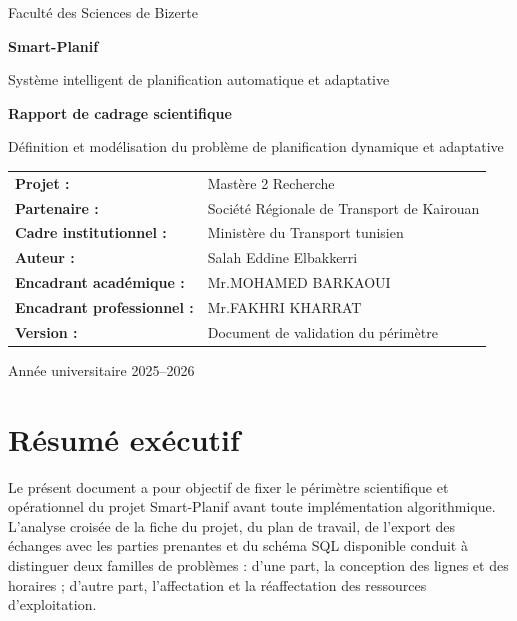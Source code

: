 \documentclass[12pt,a4paper]{article}
\begin{document}
\begin{titlepage}
\centering
\vspace*{1.5cm}
{\Large Faculté des Sciences de Bizerte\par}
\vspace{1.5cm}
{\Huge\bfseries Smart-Planif\par}
\vspace{0.4cm}
{\Large Système intelligent de planification automatique et adaptative\par}
\vspace{1.6cm}
{\LARGE\bfseries Rapport de cadrage scientifique\par}
\vspace{0.8cm}
{\large Définition et modélisation du problème de planification dynamique et adaptative \par}
\vfill
\begin{tabular}{ll}
\textbf{Projet :} & Mastère 2 Recherche \\
\textbf{Partenaire :} & Société Régionale de Transport de Kairouan \\
\textbf{Cadre institutionnel :} & Ministère du Transport tunisien \\
\textbf{Auteur :} & Salah Eddine Elbakkerri \\
\textbf{Encadrant académique :} & Mr.MOHAMED BARKAOUI \\
\textbf{Encadrant professionnel :} & Mr.FAKHRI KHARRAT \\
\textbf{Version :} & Document de validation du périmètre \\
\end{tabular}
\vfill
{\large Année universitaire 2025--2026\par}
\end{titlepage}

\tableofcontents
\newpage

\section*{Résumé exécutif}

Le présent document a pour objectif de fixer le périmètre scientifique et opérationnel du projet Smart-Planif avant toute implémentation algorithmique. L’analyse croisée de la fiche du projet, du plan de travail, de l’export des échanges avec les parties prenantes et du schéma SQL disponible conduit à distinguer deux familles de problèmes : d’une part, la conception des lignes et des horaires ; d’autre part, l’affectation et la réaffectation des ressources d’exploitation.
\end{document}
